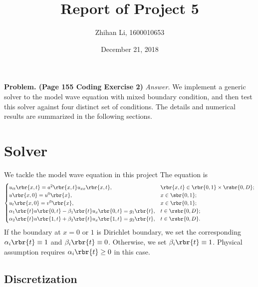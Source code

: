 \documentclass[english, nochinese]{pnote}
\title{Report of Project 5}
\author{Zhihan Li, 1600010653}
\date{December 21, 2018}
\begin{document}
\maketitle
\textbf{Problem. (Page 155 Coding Exercise 2)} \textit{Answer.} We implement a generic solver to the model wave equation with mixed boundary condition, and then test this solver against four distinct set of conditions. The details and numerical results are summarized in the following sections.

\section{Solver}

We tackle the model wave equation in this project The equation is
\begin{equation}
\begin{cases}
u_{ t t } \rbr{ x, t } = a^2 \rbr{ x, t } u_{ x x } \rbr{ x, t }, & \rbr{ x, t } \in \rbr{ 0, 1 } \times \rsbr{ 0, D }; \\
u \rbr{ x, 0 } = u^0 \rbr{x}, & x \in \sbr{ 0, 1 }; \\
u_t \rbr{ x, 0 } = v^0 \rbr{x}, & x \in \rbr{ 0, 1 }; \\
\alpha_1 \rbr{t} u \rbr{ 0, t } - \beta_1 \rbr{t} u_x \rbr{ 0, t } = g_1 \rbr{t}, & t \in \rsbr{ 0, D }; \\
\alpha_2 \rbr{t} u \rbr{ 1, t } + \beta_2 \rbr{t} u_x \rbr{ 1, t } = g_2 \rbr{t}, & t \in \rsbr{ 0, D }. \\
\end{cases}
\end{equation}
If the boundary at $ x = 0 $ or $1$ is Dirichlet boundary, we set the corresponding $ \alpha_i \rbr{t} \equiv 1 $ and $ \beta_i \rbr{t} \equiv 0 $. Otherwise, we set $ \beta_i \rbr{t} \equiv 1 $. Physical assumption requires $ \alpha_i \rbr{t} \ge 0 $ in this case.

\subsection{Discretization}
\end{document}
